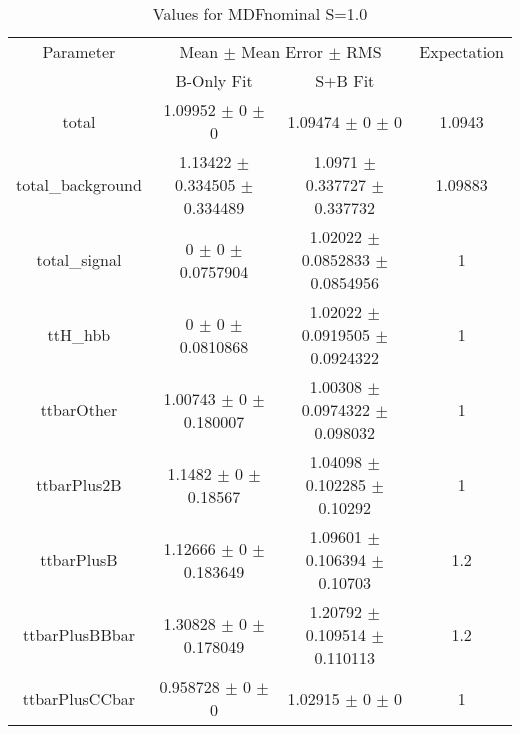 \begin{table}
\centering
\caption{Values for MDFnominal S=1.0}
\begin{tabular}{cccc}
\toprule
Parameter & \multicolumn{2}{c}{Mean $\pm$ Mean Error $\pm$ RMS} & Expectation\\
 & B-Only Fit & S+B Fit & \\
\midrule
total & \num{1.09952} $\pm$ \num{0} $\pm$ \num{0} & \num{1.09474} $\pm$ \num{0} $\pm$ \num{0} & \num{1.0943}\\
total\_background & \num{1.13422} $\pm$ \num{0.334505} $\pm$ \num{0.334489} & \num{1.0971} $\pm$ \num{0.337727} $\pm$ \num{0.337732} & \num{1.09883}\\
total\_signal & \num{0} $\pm$ \num{0} $\pm$ \num{0.0757904} & \num{1.02022} $\pm$ \num{0.0852833} $\pm$ \num{0.0854956} & \num{1}\\
ttH\_hbb & \num{0} $\pm$ \num{0} $\pm$ \num{0.0810868} & \num{1.02022} $\pm$ \num{0.0919505} $\pm$ \num{0.0924322} & \num{1}\\
ttbarOther & \num{1.00743} $\pm$ \num{0} $\pm$ \num{0.180007} & \num{1.00308} $\pm$ \num{0.0974322} $\pm$ \num{0.098032} & \num{1}\\
ttbarPlus2B & \num{1.1482} $\pm$ \num{0} $\pm$ \num{0.18567} & \num{1.04098} $\pm$ \num{0.102285} $\pm$ \num{0.10292} & \num{1}\\
ttbarPlusB & \num{1.12666} $\pm$ \num{0} $\pm$ \num{0.183649} & \num{1.09601} $\pm$ \num{0.106394} $\pm$ \num{0.10703} & \num{1.2}\\
ttbarPlusBBbar & \num{1.30828} $\pm$ \num{0} $\pm$ \num{0.178049} & \num{1.20792} $\pm$ \num{0.109514} $\pm$ \num{0.110113} & \num{1.2}\\
ttbarPlusCCbar & \num{0.958728} $\pm$ \num{0} $\pm$ \num{0} & \num{1.02915} $\pm$ \num{0} $\pm$ \num{0} & \num{1}\\
\bottomrule
\end{tabular}
\end{table}